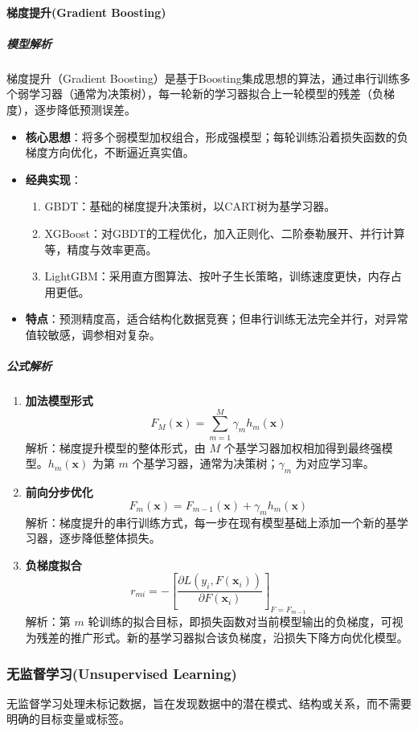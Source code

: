 \documentclass[12pt]{article}
\begin{document}
\paragraph{梯度提升(Gradient Boosting)}
\subparagraph{模型解析}
梯度提升（Gradient Boosting）是基于Boosting集成思想的算法，通过串行训练多个弱学习器（通常为决策树），每一轮新的学习器拟合上一轮模型的残差（负梯度），逐步降低预测误差。
\begin{itemize}
    \item \textbf{核心思想}：将多个弱模型加权组合，形成强模型；每轮训练沿着损失函数的负梯度方向优化，不断逼近真实值。
    \item \textbf{经典实现}：
    \begin{enumerate}
        \item GBDT：基础的梯度提升决策树，以CART树为基学习器。
        \item XGBoost：对GBDT的工程优化，加入正则化、二阶泰勒展开、并行计算等，精度与效率更高。
        \item LightGBM：采用直方图算法、按叶子生长策略，训练速度更快，内存占用更低。
    \end{enumerate}
    \item \textbf{特点}：预测精度高，适合结构化数据竞赛；但串行训练无法完全并行，对异常值较敏感，调参相对复杂。
\end{itemize}

\subparagraph{公式解析}
\begin{enumerate}
    \item \textbf{加法模型形式}
    \[
    F_M(\boldsymbol{x}) = \sum_{m=1}^M \gamma_m h_m(\boldsymbol{x})
    \]
    解析：梯度提升模型的整体形式，由 $M$ 个基学习器加权相加得到最终强模型。$h_m(\boldsymbol{x})$ 为第 $m$ 个基学习器，通常为决策树；$\gamma_m$ 为对应学习率。

    \item \textbf{前向分步优化}
    \[
    F_m(\boldsymbol{x}) = F_{m-1}(\boldsymbol{x}) + \gamma_m h_m(\boldsymbol{x})
    \]
    解析：梯度提升的串行训练方式，每一步在现有模型基础上添加一个新的基学习器，逐步降低整体损失。

    \item \textbf{负梯度拟合}
    \[
    r_{mi} = -\left[ \frac{\partial L(y_i, F(\boldsymbol{x}_i))}{\partial F(\boldsymbol{x}_i)} \right]_{F=F_{m-1}}
    \]
    解析：第 $m$ 轮训练的拟合目标，即损失函数对当前模型输出的负梯度，可视为残差的推广形式。新的基学习器拟合该负梯度，沿损失下降方向优化模型。
\end{enumerate}

\subsubsection{无监督学习(Unsupervised Learning)}
无监督学习处理未标记数据，旨在发现数据中的潜在模式、结构或关系，而不需要明确的目标变量或标签。
\end{document}
